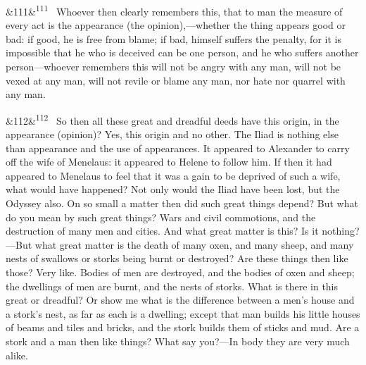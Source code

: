 \documentclass[12pt]{article}
\newcommand{\para}[1][]{\par\noindent\ifx&#1&\else\textsuperscript{\footnotesize #1}~\fi}
\begin{document}
\para[111] Whoever then clearly remembers this, that to man the measure of every act is the appearance (the opinion),—whether the thing appears good or bad: if good, he is free from blame; if bad, himself suffers the penalty, for it is impossible that he who is deceived can be one person, and he who suffers another person—whoever remembers this will not be angry with any man, will not be vexed at any man, will not revile or blame any man, nor hate nor quarrel with any man.

\para[112] So then all these great and dreadful deeds have this origin, in the appearance (opinion)? Yes, this origin and no other. The Iliad is nothing else than appearance and the use of appearances. It appeared to Alexander to carry off the wife of Menelaus: it appeared to Helene to follow him. If then it had appeared to Menelaus to feel that it was a gain to be deprived of such a wife, what would have happened? Not only would the Iliad have been lost, but the Odyssey also. On so small a matter then did such great things depend? But what do you mean by such great things? Wars and civil commotions, and the destruction of many men and cities. And what great matter is this? Is it nothing?—But what great matter is the death of many oxen, and many sheep, and many nests of swallows or storks being burnt or destroyed? Are these things then like those? Very like. Bodies of men are destroyed, and the bodies of oxen and sheep; the dwellings of men are burnt, and the nests of storks. What is there in this great or dreadful? Or show me what is the difference between a men's house and a stork's nest, as far as each is a dwelling; except that man builds his little houses of beams and tiles and bricks, and the stork builds them of sticks and mud. Are a stork and a man then like things? What say you?—In body they are very much alike.
\end{document}
